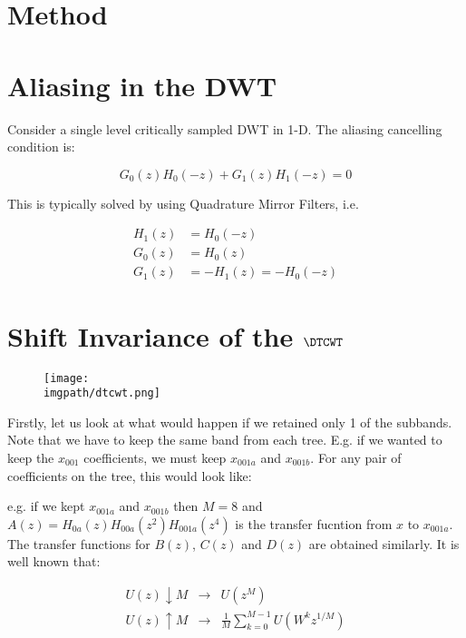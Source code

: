\section{Method}\label{sec:ch6:method}

\section{Aliasing in the DWT}
Consider a single level critically sampled DWT in 1-D. The aliasing cancelling
condition is:

$$G_0(z)H_0(-z) + G_1(z)H_1(-z) = 0$$

This is typically solved by using Quadrature Mirror Filters, i.e.

\begin{align}
  H_1(z) &= H_0(-z) \\
  G_0(z) &= H_0(z) \\
  G_1(z) &= -H_1(z) = -H_0(-z) 
\end{align}

\section{Shift Invariance of the $\DTCWT$}
\begin{figure}
  \texttt{[image: \\imgpath/dtcwt.png]}
\end{figure}

\begin{figure}
  \centering
  
  \label{fig:dtcwt_two_tree}
\end{figure}

Firstly, let us look at what would happen if we retained only 1 of the subbands.
Note that we have to keep the same band from each tree. E.g. if we wanted to
keep the $x_{001}$ coefficients, we must keep $x_{001a}$ and $x_{001b}$. For any
pair of coefficients on the tree, this would look like:

e.g. if we kept $x_{001a}$ and $x_{001b}$ then $M=8$ and $A(z) =
H_{0a}(z)H_{00a}(z^2)H_{001a}(z^4)$ is the transfer fucntion from $x$ to
$x_{001a}$. The transfer functions for $B(z)$, $C(z)$ and $D(z)$ are obtained
similarly. It is well known that:

\begin{eqnarray}
  U(z) \downarrow M &\rightarrow&  U(z^M) \\
  U(z) \uparrow M &\rightarrow & \frac{1}{M}\sum_{k=0}^{M-1}U(W^kz^{1/M})
\end{eqnarray}

